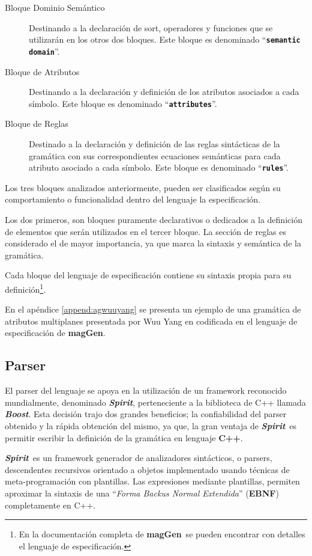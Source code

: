 \documentclass[runningheads,a4paper]{llncs}
\newcommand{\textbtt}[1]{\texttt{\textbf{#1}}}
\newcommand{\maggen}{\textbf{magGen}}
\newcommand{\boost}{\textit{\textbf{Boost}}}
\newcommand{\spirit}{\textit{\textbf{Spirit}}}
\begin{document}
\begin{description}
\item [Bloque Dominio Semántico] Destinando a la declaración de sort, operadores y funciones que se utilizarán en los otros dos bloques. Este bloque es denominado ``\textbtt{semantic domain}''.

\item [Bloque de Atributos] Destinando a la declaración y definición de los atributos asociados a cada símbolo. Este bloque es denominado ``\textbtt{attributes}''.

\item [Bloque de Reglas] Destinado a la declaración y definición de las reglas sintácticas de la gramática con sus correspondientes ecuaciones semánticas para cada atributo asociado a cada símbolo. Este bloque es denominado ``\textbtt{rules}''.
\end{description}

Los tres bloques analizados anteriormente, pueden ser clasificados según su comportamiento o funcionalidad dentro del lenguaje la especificación.

Los dos primeros, son bloques puramente declarativos o dedicados a la definición de elementos que serán utilizados en el tercer bloque. La sección de reglas es considerado el de mayor importancia, ya que marca la sintaxis y semántica de la gramática.

Cada bloque del lenguaje de especificación contiene su sintaxis propia para su definición\footnote{En la documentación completa de \maggen\ se pueden encontrar con detalles el lenguaje de especificación.}.

En el apéndice \ref{append:agwuuyang} se presenta un ejemplo de una gramática de atributos multiplanes presentada por Wuu Yang en \cite{wuu-yang1} codificada en el lenguaje de especificación de \maggen.

\subsection{Parser}

El parser del lenguaje se apoya en la utilización de un framework reconocido mundialmente, denominado \spirit, perteneciente a la biblioteca de C++ llamada \boost. Esta decisión trajo dos grandes beneficios; la confiabilidad del parser obtenido y la rápida obtención del mismo, ya que, la gran ventaja de \spirit\ es permitir escribir la definición de la gramática en lenguaje \textbf{C++}.

\spirit\ es un framework generador de analizadores sintácticos, o parsers, descendentes recursivos orientado a objetos implementado usando técnicas de meta-programación con plantillas. Las expresiones mediante plantillas, permiten aproximar la sintaxis de una ``\textit{\textit{Forma Backus Normal Extendida}}'' (\textbf{EBNF}) completamente en C++.
\end{document}
